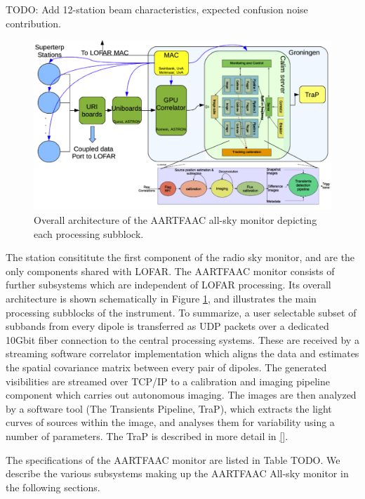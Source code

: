 \documentclass{ws-jai}
\begin{document}
TODO: Add 12-station beam characteristics, expected confusion noise contribution.

\begin{figure}[htbp]
\centering
\includegraphics[width=1\textwidth]{Figs/overall_afaac_Arch_blks.png}
\caption {Overall  architecture of the  AARTFAAC all-sky monitor  depicting each
  processing subblock.}
\label{fig:afaac_arch}
\end{figure}

The station  consititute the first component  of the radio sky  monitor, and are
the only components shared with LOFAR.  The AARTFAAC monitor consists of further
subsystems which are independent of  LOFAR processing.  Its overall architecture
is shown schematically in Figure  \ref{fig:afaac_arch}, and illustrates the main
processing subblocks of the instrument.   To summarize, a user selectable subset
of subbands  from every dipole  is transferred as  UDP packets over  a dedicated
10Gbit fiber connection  to the central processing systems.   These are received
by  a streaming  software correlator  implementation which  aligns the  data and
estimates  the spatial  covariance matrix  between every  pair of  dipoles.  The
generated visibilities  are streamed  over TCP/IP to  a calibration  and imaging
pipeline component  which carries out  autonomous imaging.  The images  are then
analyzed by a software tool (The  Transients Pipeline, TraP), which extracts the
light curves  of sources  within the  image, and  analyses them  for variability
using a number of parameters. The TraP is described in more detail in \ref{}.

The  specifications of  the  AARTFAAC  monitor are  listed  in  Table TODO.   We
describe the  various subsystems making up  the AARTFAAC All-sky monitor  in the
following sections.
\end{document}
